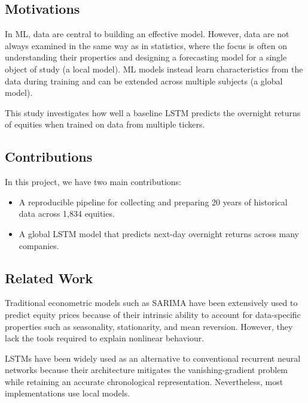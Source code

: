 \documentclass[12pt,a4paper]{article}
\begin{document}
\subsection{Motivations}
In ML, data are central to building an effective model. However, data are not
always examined in the same way as in statistics, where the focus is often on
understanding their properties and designing a forecasting model for a single
object of study (a local model). ML models instead learn characteristics from
the data during training and can be extended across multiple subjects (a global
model).

This study investigates how well a baseline LSTM predicts the overnight returns
of equities when trained on data from multiple tickers.

\subsection{Contributions}
In this project, we have two main contributions: 
\begin{itemize}
    \item A reproducible pipeline for collecting and preparing 20 years of historical data across 1,834 equities.
    \item A global LSTM model that predicts next-day overnight returns across many companies.

\end{itemize}

\subsection{Related Work}
Traditional econometric models such as SARIMA \cite{box2015} have been
extensively used to predict equity prices because of their intrinsic ability to
account for data-specific properties such as seasonality, stationarity, and mean
reversion. However, they lack the tools required to explain nonlinear behaviour.

LSTMs \cite{vennerod2021} have been widely used as an alternative to
conventional recurrent neural networks because their architecture mitigates the
vanishing-gradient problem while retaining an accurate chronological
representation. Nevertheless, most implementations use local models.
\end{document}
